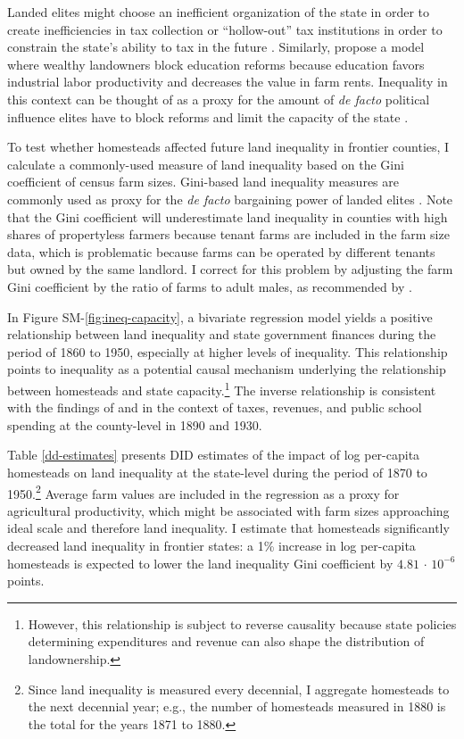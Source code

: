 \documentclass[hidelinks,12pt]{article}
\begin{document}
Landed elites might choose an inefficient organization of the state in order to create inefficiencies in tax collection \citep{acemoglu2011emergence} or ``hollow-out'' tax institutions in order to constrain the state's ability to tax in the future \citep{suryanarayan2017hollowing}. Similarly, \citet{galor2009inequality} propose a model where wealthy landowners block education reforms because education favors industrial labor productivity and decreases the value in farm rents. Inequality in this context can be thought of as a proxy for the amount of \emph{de facto} political influence elites have to block reforms and limit the capacity of the state \citep{acemoglu2008persistence}. 

To test whether homesteads affected future land inequality in frontier counties, I calculate a commonly-used measure of land inequality based on the Gini coefficient of census farm sizes. Gini-based land inequality measures are commonly used as proxy for the \emph{de facto} bargaining power of landed elites \citep[e.g.,][]{boix2003democracy,ziblatt2008does,ansell2015}. Note that the Gini coefficient will underestimate land inequality in counties with high shares of propertyless farmers because tenant farms are included in the farm size data, which is problematic because farms can be operated by different tenants but owned by the same landlord. I correct for this problem by adjusting the farm Gini coefficient by the ratio of farms to adult males, as recommended by \citet{vollrath2013inequality}.

In Figure SM-\ref{fig:ineq-capacity}, a bivariate regression model yields a positive relationship between land inequality and state government finances during the period of 1860 to 1950, especially at higher levels of inequality. This relationship points to inequality as a potential causal mechanism underlying the relationship between homesteads and state capacity.\footnote{However, this relationship is subject to reverse causality because state policies determining expenditures and revenue can also shape the distribution of landownership.} The inverse relationship is consistent with the findings of \citet{ramcharan2010inequality} and \citet{vollrath2013inequality} in the context of taxes, revenues, and public school spending at the county-level in 1890 and 1930.

Table \ref{dd-estimates} presents DID estimates of the impact of log per-capita homesteads on land inequality at the state-level during the period of 1870 to 1950.\footnote{Since land inequality is measured every decennial, I aggregate homesteads to the next decennial year; e.g., the number of homesteads measured in 1880 is the total for the years 1871 to 1880.} Average farm values are included in the regression as a proxy for agricultural productivity, which might be associated with farm sizes approaching ideal scale and therefore land inequality. I estimate that homesteads significantly decreased land inequality in frontier states: a 1\% increase in log per-capita homesteads is expected to lower the land inequality Gini coefficient by $4.81\,\cdot\,10^{-6}$ points. 
\end{document}
